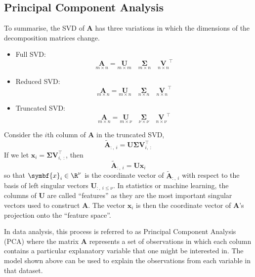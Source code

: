 \documentclass{article}
\begin{document}
\subsection{Principal Component Analysis}
To summarise, the SVD of \(\symbf{A}\) has three variations in which
the dimensions of the decomposition matrices change.
\begin{itemize}
    \item Full SVD\@:
          \begin{equation*}
              \underset{m \times n}{\symbf{A}} = \underset{m \times m}{\symbf{U}} \quad \underset{m \times n}{\symbf{\Sigma}} \quad \underset{n \times n}{\symbf{V}}^\top
          \end{equation*}
    \item Reduced SVD\@:
          \begin{equation*}
              \underset{m \times n}{\symbf{A}} = \underset{m \times n}{\symbf{U}} \quad \underset{n \times n}{\symbf{\Sigma}} \quad \underset{n \times n}{\symbf{V}}^\top
          \end{equation*}
    \item Truncated SVD\@:
          \begin{equation*}
              \underset{m \times n}{\symbf{A}} = \underset{m \times \nu}{\symbf{U}} \quad \underset{\nu \times \nu}{\symbf{\Sigma}} \quad \underset{n \times \nu}{\symbf{V}}^\top
          \end{equation*}
\end{itemize}
Consider the \(i\)th column of \(\symbf{A}\) in the truncated SVD,
\begin{equation*}
    \tilde{\symbf{A}}_{:,\:i} = \symbf{U} \symbf{\Sigma} \symbf{V}_{i,\: :}^\top
\end{equation*}
If we let \(\symbf{x}_i = \symbf{\Sigma} \symbf{V}_{i,\: :}^\top\), then
\begin{equation*}
    \tilde{\symbf{A}}_{:,\:i} = \symbf{U} \symbf{x}_i
\end{equation*}
so that \(\symbf{x}_i \in \R^{\nu}\) is the coordinate vector of \(\tilde{\symbf{A}}_{:,\:i}\) with respect to the basis of left
singular vectors \(\symbf{U}_{:,\: i \leq \nu}\). In statistics or machine learning, the columns of \(\symbf{U}\) are called ``features''
as they are the most important singular vectors used to construct \(\symbf{A}\). The vector \(\symbf{x}_i\) is then the coordinate
vector of \(\symbf{A}\)'s projection onto the ``feature space''.

In data analysis, this process is referred to as Principal Component
Analysis (PCA) where the matrix \(\symbf{A}\) represents a set of
observations in which each column contains a particular explanatory
variable that one might be interested in. The model shown above can be
used to explain the observations from each variable in that dataset.
\end{document}

